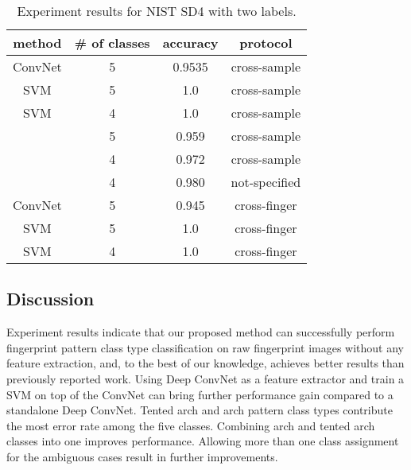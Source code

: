 \begin{table}[!ht]
	\centering
	\caption{Experiment results for NIST SD4 with two labels.}
	\label{tab.SD4_result_two_labels}
	\begin{tabular}{|c|c|c|c|}
		\hline
		\textbf{method} & \textbf{\# of classes} & \textbf{accuracy} & \textbf{protocol} \\ \hline
		ConvNet & 5 & 0.9535 & cross-sample \\ \hline
		SVM & 5 & 1.0 & cross-sample \\ \hline
		SVM & 4 & 1.0 & cross-sample \\ \hline
		\cite{cao2013fingerprint} & 5 & 0.959 & cross-sample \\ \hline
		\cite{cao2013fingerprint}& 4 & 0.972 & cross-sample \\ \hline
		\cite{wang2014fingerprint} & 4 & 0.980 & not-specified \\ \hline
		ConvNet & 5 & 0.945 & cross-finger \\ \hline
		SVM & 5 & 1.0 & cross-finger \\ \hline
		SVM & 4 & 1.0 & cross-finger \\ \hline
	\end{tabular}
\end{table}

\subsection{Discussion}
\label{sec_discussion}
%
Experiment results indicate that our proposed method can successfully perform fingerprint pattern class type classification on raw fingerprint images without any feature extraction, and, to the best of our knowledge, achieves better results than previously reported work. 
Using Deep ConvNet as a feature extractor and train a SVM on top of the ConvNet can bring further performance gain compared to a standalone Deep ConvNet.  
%
%
%
Tented arch and arch pattern class types contribute the most error rate among the five classes.  Combining arch and tented arch classes into one improves performance. Allowing more than one class assignment for the ambiguous cases result in further improvements.
%
%


